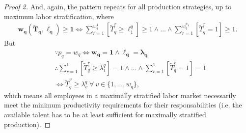\documentclass[hidelinks, nonatbib]{elsarticle}
\begin{document}
\begin{lemma}
\begin{proof}[Proof 2]
        And, again, the pattern repeats for all production strategies, up to maximum labor stratification, where
        \begin{gather}
            \boldsymbol{w_q}(
                \boldsymbol{\tilde{T}_q},
                \boldsymbol{\ell_q}
            )
            \geq
            \boldsymbol{1}
            \iff
            \sum_{r=1}^{w_{q}^{1}}
            [\tilde{T}_{q}^{r} \geq \ell_{1}^{q}]
            \geq
            1
            \land
            \dots
            \land
            \sum_{r=1}^{w_{q}^{w_q}}
            [\tilde{T}_{q}^{r} = 1]
            \geq
            1
            .
        \end{gather}
        But
        \begin{align}
            &\because
            p_q = w_q
            \iff
            \boldsymbol{w_q} =
            \boldsymbol{1}
            \land
            \boldsymbol{\ell_q} =
            \boldsymbol{\lambda_q}
            \\
            &\therefore
            \sum_{r=1}^{1}
            [\tilde{T}_{q}^{r} \geq \lambda_{1}^{q}]
            =
            1
            \land
            \dots
            \land
            \sum_{r=1}^{1}
            [\tilde{T}_{q}^{r} = 1]
            =
            1
            \\
            &\iff
            \tilde{T}_{q}^{v} \geq \lambda_{v}^{q}
            \
            \forall
            \
            v \in \{1, \dots, w_q\}
            ,
        \end{align}
        which means all employees in a maximally stratified labor market necessarily meet the minimum productivity requirements for their responsabilities (i.e. the available talent has to be at least sufficient for maximally stratified production).
        

\end{proof}
\end{lemma}
\end{document}

